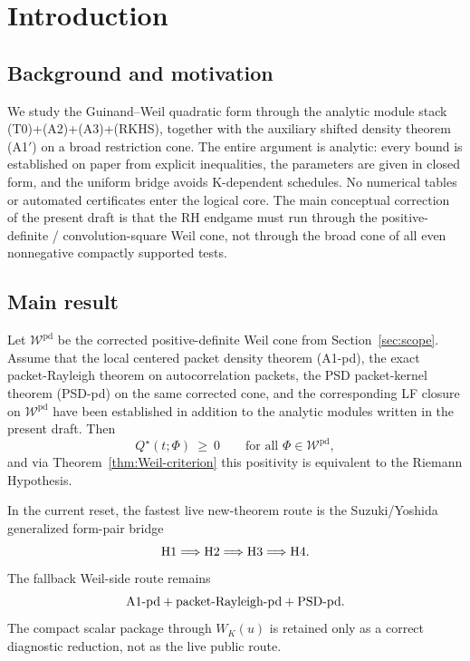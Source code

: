 \section{Introduction}\label{sec:intro}

\subsection*{Background and motivation}
We study the Guinand--Weil quadratic form through the analytic module stack \textup{(T0)}+\textup{(A2)}+\textup{(A3)}+\textup{(RKHS)}, together with the auxiliary shifted density theorem \textup{(A1$'$)} on a broad restriction cone. The entire argument is analytic: every bound is established on paper from explicit inequalities, the parameters are given in closed form, and the uniform bridge avoids K-dependent schedules. No numerical tables or automated certificates enter the logical core. The main conceptual correction of the present draft is that the RH endgame must run through the positive-definite / convolution-square Weil cone, not through the broad cone of all even nonnegative compactly supported tests.

\subsection*{Main result}
\begin{theorem}\label{thm:intro-main-informal}
Let $\mathcal W^{\mathrm{pd}}$ be the corrected positive-definite Weil cone from Section~\ref{sec:scope}. Assume that the local centered packet density theorem \textup{(A1-pd)}, the exact packet-Rayleigh theorem on autocorrelation packets, the PSD packet-kernel theorem \textup{(PSD-pd)} on the same corrected cone, and the corresponding LF closure on $\mathcal W^{\mathrm{pd}}$ have been established in addition to the analytic modules written in the present draft. Then
\[
  Q^\star(t;\Phi)\ \ge\ 0\qquad\text{for all }\Phi\in\mathcal W^{\mathrm{pd}},
\]
and via Theorem~\ref{thm:Weil-criterion} this positivity is equivalent to the Riemann Hypothesis.
\end{theorem}

\noindent In the current reset, the fastest live new-theorem route is the
Suzuki/Yoshida generalized form-pair bridge
\[
  \textup{H1} \Longrightarrow \textup{H2} \Longrightarrow \textup{H3} \Longrightarrow \textup{H4}.
\]
The fallback Weil-side route remains
\[
  \textup{A1-pd} + \textup{packet-Rayleigh-pd} + \textup{PSD-pd}.
\]
The compact scalar package through $W_K(u)$ is retained only as a correct
diagnostic reduction, not as the live public route.

